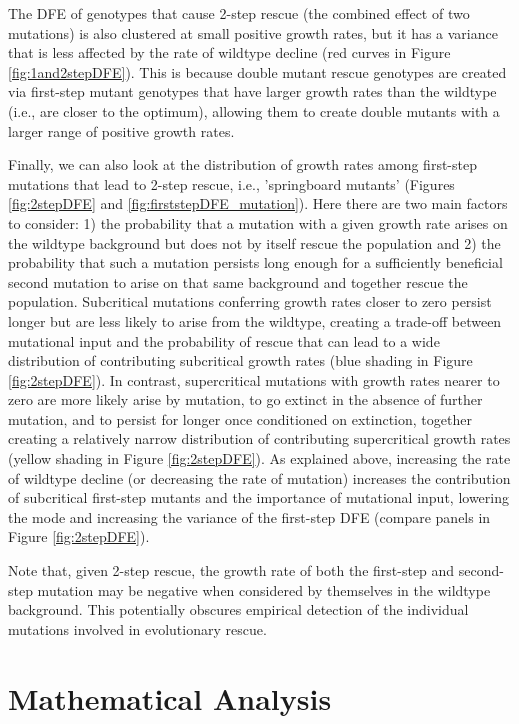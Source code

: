 \documentclass[9pt,twocolumn,twoside,lineno]{gsajnl}
\begin{document}
The DFE of genotypes that cause 2-step rescue (the combined effect of two mutations) is also clustered at small positive growth rates, but it has a variance that is less affected by the rate of wildtype decline (red curves in Figure \ref{fig:1and2stepDFE}).
This is because double mutant rescue genotypes are created via first-step mutant genotypes that have larger growth rates than the wildtype (i.e., are closer to the optimum), allowing them to create double mutants with a larger range of positive growth rates.

Finally, we can also look at the distribution of growth rates among first-step mutations that lead to 2-step rescue, i.e., 'springboard mutants' (Figures \ref{fig:2stepDFE} and \ref{fig:firststepDFE_mutation}).
Here there are two main factors to consider: 1) the probability that a mutation with a given growth rate arises on the wildtype background but does not by itself rescue the population and 2) the probability that such a mutation persists long enough for a sufficiently beneficial second mutation to arise on that same background and together rescue the population. 
Subcritical mutations conferring growth rates closer to zero persist longer but are less likely to arise from the wildtype, creating a trade-off between mutational input and the probability of rescue that can lead to a wide distribution of contributing subcritical growth rates (blue shading in Figure \ref{fig:2stepDFE}).
In contrast, supercritical mutations with growth rates nearer to zero are more likely arise by mutation, to go extinct in the absence of further mutation, and to persist for longer once conditioned on extinction, together creating a relatively narrow distribution of contributing supercritical growth rates (yellow shading in Figure \ref{fig:2stepDFE}).
As explained above, increasing the rate of wildtype decline (or decreasing the rate of mutation) increases the contribution of subcritical first-step mutants and the importance of mutational input, lowering the mode and increasing the variance of the first-step DFE (compare panels in Figure \ref{fig:2stepDFE}).

Note that, given 2-step rescue, the growth rate of both the first-step and second-step mutation may be negative when considered by themselves in the wildtype background. 
This potentially obscures empirical detection of the individual mutations involved in evolutionary rescue. 

\section{Mathematical Analysis}
\label{sec:analysis}
\end{document}
